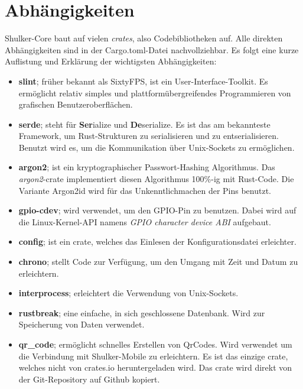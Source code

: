 \section{Abhängigkeiten}
Shulker-Core baut auf vielen \textit{crates}, also Codebibliotheken auf. Alle direkten Abhängigkeiten sind in der 
Cargo.toml-Datei nachvollziehbar. Es folgt eine kurze Auflistung und Erklärung der wichtigsten Abhängigkeiten:

\begin{itemize}
    \item \textbf{slint}; früher bekannt als SixtyFPS, ist ein User-Interface-Toolkit. Es ermöglicht relativ simples
    und plattformübergreifendes Programmieren von grafischen Benutzeroberflächen.

    \item \textbf{serde}; steht für \textbf{Ser}ialize und \textbf{De}serialize. Es ist das am bekannteste Framework,
    um Rust-Strukturen zu serialisieren und zu entserialisieren. Benutzt wird es, um die Kommunikation über Unix-Sockets zu
    ermöglichen.

    \item \textbf{argon2}; ist ein kryptographischer Passwort-Hashing Algorithmus. Das \textit{argon2}-crate implementiert diesen
    Algorithmus 100\%-ig mit Rust-Code. Die Variante Argon2id wird für das Unkenntlichmachen der Pins benutzt.

    \item \textbf{gpio-cdev}; wird verwendet, um den GPIO-Pin zu benutzen. Dabei wird auf die Linux-Kernel-API namens \textit{GPIO character device ABI}
    aufgebaut.

    \item \textbf{config}; ist ein crate, welches das Einlesen der Konfigurationsdatei erleichter.
    
    \item \textbf{chrono}; stellt Code zur Verfügung, um den Umgang mit Zeit und Datum zu erleichtern.
    
    \item \textbf{interprocess}; erleichtert die Verwendung von Unix-Sockets.
    
    \item \textbf{rustbreak}; eine einfache, in sich geschlossene Datenbank. Wird zur Speicherung von Daten verwendet.
    
    \item \textbf{qr\_code}; ermöglicht schnelles Erstellen von QrCodes. Wird verwendet um die Verbindung mit Shulker-Mobile zu
    erleichtern. Es ist das einzige crate, welches nicht von crates.io heruntergeladen wird. Das crate wird direkt von der Git-Repository auf
    Github kopiert.
\end{itemize}